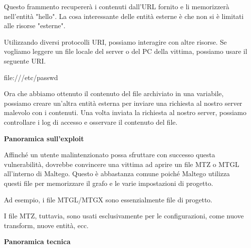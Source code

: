 \begin{flushleft}
Questo frammento recupererà i contenuti dall'URL fornito e li memorizzerà nell'entità "hello". La cosa interessante delle entità esterne è che non si è limitati alle risorse "esterne".
\end{flushleft}

\begin{flushleft}
Utilizzando diversi protocolli URI, possiamo interagire con altre risorse. Se vogliamo leggere un file locale del server o del PC della vittima, possiamo usare il seguente URI.
\end{flushleft}

\begin{flushleft}
file:///etc/passwd
\end{flushleft}

\begin{flushleft}
Ora che abbiamo ottenuto il contenuto del file archiviato in una variabile, possiamo creare un'altra entità esterna per inviare una richiesta al nostro server malevolo con i contenuti. Una volta inviata la richiesta al nostro server, possiamo controllare i log di accesso e osservare il contenuto del file.
\end{flushleft}

\begin{flushleft}
\textbf{Panoramica sull'exploit}
\end{flushleft}


\begin{flushleft}
Affinché un utente malintenzionato possa sfruttare con successo questa vulnerabilità, dovrebbe convincere una vittima ad aprire un file MTZ o MTGL all'interno di Maltego. Questo è abbastanza comune poiché Maltego utilizza questi file per memorizzare il grafo e le varie impostazioni di progetto.
\end{flushleft}

\begin{flushleft}
Ad esempio, i file MTGL/MTGX sono essenzialmente file di progetto.
\end{flushleft}

\begin{flushleft}
I file MTZ, tuttavia, sono usati esclusivamente per le configurazioni, come nuove transform, nuove entità, ecc.
\end{flushleft}

\begin{flushleft}
\textbf{Panoramica tecnica}
\end{flushleft}


